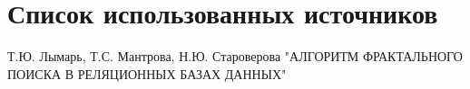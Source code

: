 \section*{Список использованных источников}

\begin{thebibliography}{3}
 Т.Ю. Лымарь, Т.С. Мантрова, Н.Ю. Староверова "АЛГОРИТМ ФРАКТАЛЬНОГО ПОИСКА  В РЕЛЯЦИОННЫХ БАЗАХ ДАННЫХ"
\end{thebibliography}